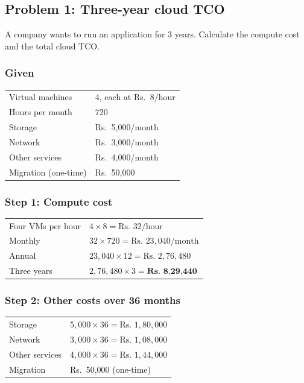 \documentclass[11pt,a4paper]{article}
\begin{document}
\subsection*{Problem 1: Three-year cloud TCO}

A company wants to run an application for 3 years. Calculate the compute cost and the total
cloud TCO.

\subsubsection*{Given}

\begin{tabularx}{\textwidth}{@{}lX@{}}
Virtual machines & 4, each at Rs.\ 8/hour \\
Hours per month & 720 \\
Storage & Rs.\ 5,000/month \\
Network & Rs.\ 3,000/month \\
Other services & Rs.\ 4,000/month \\
Migration (one-time) & Rs.\ 50,000 \\
\end{tabularx}

\subsubsection*{Step 1: Compute cost}

\begin{tabularx}{\textwidth}{@{}lX@{}}
Four VMs per hour & $4 \times 8 = \text{Rs. } 32/\text{hour}$ \\
Monthly & $32 \times 720 = \text{Rs. } 23{,}040/\text{month}$ \\
Annual & $23{,}040 \times 12 = \text{Rs. } 2{,}76{,}480$ \\
Three years & $2{,}76{,}480 \times 3 = \textbf{Rs. 8,29,440}$ \\
\end{tabularx}

\subsubsection*{Step 2: Other costs over 36 months}

\begin{tabularx}{\textwidth}{@{}lX@{}}
Storage & $5{,}000 \times 36 = \text{Rs. } 1{,}80{,}000$ \\
Network & $3{,}000 \times 36 = \text{Rs. } 1{,}08{,}000$ \\
Other services & $4{,}000 \times 36 = \text{Rs. } 1{,}44{,}000$ \\
Migration & Rs.\ 50,000 (one-time) \\
\end{tabularx}
\end{document}
